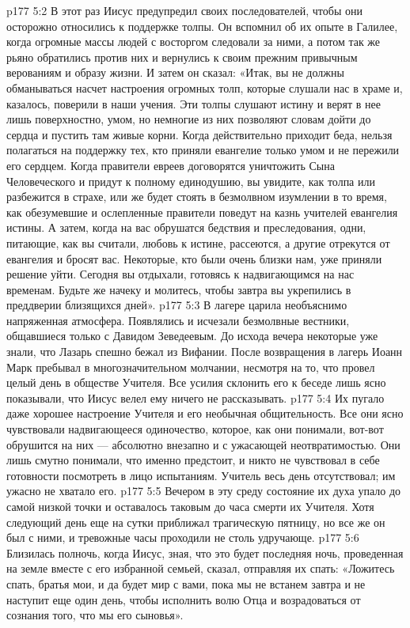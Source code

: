 \vs p177 5:2 В этот раз Иисус предупредил своих последователей, чтобы они осторожно относились к поддержке толпы. Он вспомнил об их опыте в Галилее, когда огромные массы людей с восторгом следовали за ними, а потом так же рьяно обратились против них и вернулись к своим прежним привычным верованиям и образу жизни. И затем он сказал: «Итак, вы не должны обманываться насчет настроения огромных толп, которые слушали нас в храме и, казалось, поверили в наши учения. Эти толпы слушают истину и верят в нее лишь поверхностно, умом, но немногие из них позволяют словам дойти до сердца и пустить там живые корни. Когда действительно приходит беда, нельзя полагаться на поддержку тех, кто приняли евангелие только умом и не пережили его сердцем. Когда правители евреев договорятся уничтожить Сына Человеческого и придут к полному единодушию, вы увидите, как толпа или разбежится в страхе, или же будет стоять в безмолвном изумлении в то время, как обезумевшие и ослепленные правители поведут на казнь учителей евангелия истины. А затем, когда на вас обрушатся бедствия и преследования, одни, питающие, как вы считали, любовь к истине, рассеются, а другие отрекутся от евангелия и бросят вас. Некоторые, кто были очень близки нам, уже приняли решение уйти. Сегодня вы отдыхали, готовясь к надвигающимся на нас временам. Будьте же начеку и молитесь, чтобы завтра вы укрепились в преддверии близящихся дней».
\vs p177 5:3 В лагере царила необъяснимо напряженная атмосфера. Появлялись и исчезали безмолвные вестники, общавшиеся только с Давидом Зеведеевым. До исхода вечера некоторые уже знали, что Лазарь спешно бежал из Вифании. После возвращения в лагерь Иоанн Марк пребывал в многозначительном молчании, несмотря на то, что провел целый день в обществе Учителя. Все усилия склонить его к беседе лишь ясно показывали, что Иисус велел ему ничего не рассказывать.
\vs p177 5:4 Их пугало даже хорошее настроение Учителя и его необычная общительность. Все они ясно чувствовали надвигающееся одиночество, которое, как они понимали, вот\hyp{}вот обрушится на них --- абсолютно внезапно и с ужасающей неотвратимостью. Они лишь смутно понимали, что именно предстоит, и никто не чувствовал в себе готовности посмотреть в лицо испытаниям. Учитель весь день отсутствовал; им ужасно не хватало его.
\vs p177 5:5 Вечером в эту среду состояние их духа упало до самой низкой точки и оставалось таковым до часа смерти их Учителя. Хотя следующий день еще на сутки приближал трагическую пятницу, но все же он был с ними, и тревожные часы проходили не столь удручающе.
\vs p177 5:6 Близилась полночь, когда Иисус, зная, что это будет последняя ночь, проведенная на земле вместе с его избранной семьей, сказал, отправляя их спать: «Ложитесь спать, братья мои, и да будет мир с вами, пока мы не встанем завтра и не наступит еще один день, чтобы исполнить волю Отца и возрадоваться от сознания того, что мы его сыновья».
